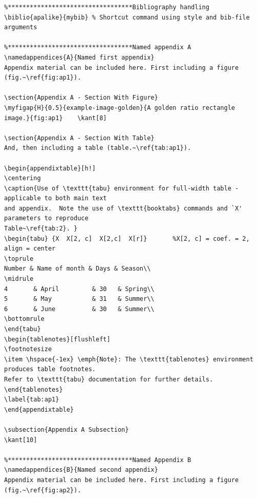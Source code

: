 \documentclass{article}
\begin{document}
\begin{verbatim}
%**********************************Bibliography handling
\biblio{apalike}{mybib} % Shortcut command using style and bib-file arguments

%**********************************Named appendix A
\namedappendices{A}{Named first appendix}
Appendix material can be included here. First including a figure (fig.~\ref{fig:ap1}).

\section{Appendix A - Section With Figure}
\myfigap{H}{0.5}{example-image-golden}{A golden ratio rectangle image.}{fig:ap1}	\kant[8]

\section{Appendix A - Section With Table}
And, then including a table (table.~\ref{tab:ap1}).

\begin{appendixtable}[h!]
\centering
\caption{Use of \texttt{tabu} environment for full-width table - applicable to both main text
and appendix.  Note the use of \texttt{booktabs} commands and `X' parameters to reproduce 
Table~\ref{tab:2}. }
\begin{tabu} {X  X[2, c]  X[2,c]  X[r]}       %X[2, c] = coef. = 2, align = center 
\toprule
Number & Name of month & Days & Season\\
\midrule
4 	    & April         & 30   & Spring\\
5 	    & May           & 31   & Summer\\
6 	    & June          & 30   & Summer\\
\bottomrule
\end{tabu}
\begin{tablenotes}[flushleft]
\footnotesize
\item \hspace{-1ex} \emph{Note}: The \texttt{tablenotes} environment produces table footnotes.  
Refer to \texttt{tabu} documentation for further details.  
\end{tablenotes}
\label{tab:ap1}
\end{appendixtable}

\subsection{Appendix A Subsection}
\kant[10]

%**********************************Named Appendix B
\namedappendices{B}{Named second appendix}
Appendix material can be included here. First including a figure (fig.~\ref{fig:ap2}).


\end{verbatim}
\end{document}
